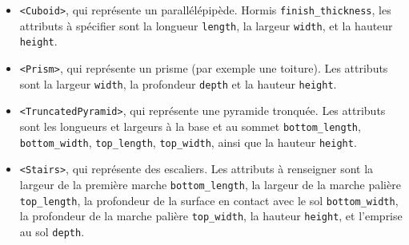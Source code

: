 \documentclass{article}
\begin{document}
\begin{itemize}
 \item \texttt{<Cuboid>}, qui représente un parallélépipède. Hormis \texttt{finish\_thickness}, les attributs à spécifier sont la longueur \texttt{length}, la largeur \texttt{width}, et la hauteur \texttt{height}.
 
 \item \texttt{<Prism>}, qui représente un prisme (par exemple une toiture). Les attributs sont la largeur \texttt{width}, la profondeur \texttt{depth} et la hauteur \texttt{height}.
 
 \item \texttt{<TruncatedPyramid>}, qui représente une pyramide tronquée. Les attributs sont les longueurs et largeurs à la base et au sommet \texttt{bottom\_length}, \texttt{bottom\_width}, \texttt{top\_length}, \texttt{top\_width}, ainsi que la hauteur \texttt{height}.
 
 \item \texttt{<Stairs>}, qui représente des escaliers. Les attributs à renseigner sont la largeur de la première marche \texttt{bottom\_length}, la largeur de la marche palière \texttt{top\_length}, la profondeur de la surface en contact avec le sol \texttt{bottom\_width}, la profondeur de la marche palière \texttt{top\_width}, la hauteur \texttt{height}, et l'emprise au sol \texttt{depth}.
\end{itemize}
\end{document}
